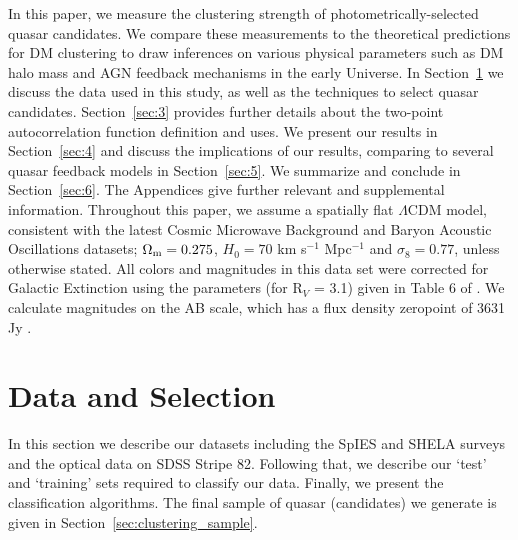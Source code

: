 \documentclass[apj, numberedappendix]{emulateapj}
\begin{document}
In this paper, we measure the clustering strength of photometrically-selected quasar candidates. We compare these measurements to the theoretical predictions for DM clustering to draw inferences on various physical parameters such as DM halo mass and AGN feedback mechanisms in the early Universe. In Section~\ref{sec:2} we discuss the data used in this study, as well as the techniques to select quasar candidates. Section~\ref{sec:3} provides further details about the two-point autocorrelation function definition and uses. We present our results in Section~\ref{sec:4} and discuss the implications of our results, comparing to several quasar feedback models in Section~\ref{sec:5}. We summarize and conclude in Section~\ref{sec:6}. The Appendices give further relevant and supplemental information. Throughout this paper, we assume a spatially flat $\Lambda$CDM model, consistent with the latest Cosmic Microwave Background \citep[CMB;][]{Planck2016} and Baryon Acoustic Oscillations \citep[BOSS;][]{Alam2016} datasets;  $\Omega_{\rm m} = 0.275$, $H_{0} = 70$ km s$^{-1}$ Mpc$^{-1}$ and $\sigma_{8}=0.77$, unless otherwise stated. All colors and magnitudes in this data set were corrected for Galactic Extinction using the parameters (for R$_V$ = 3.1) given in Table 6 of \citet{Schlafly2011}. We calculate magnitudes on the AB scale, which has a flux density zeropoint of 3631 Jy \citep{OkeGunn1983}.


\section{Data and Selection} \label{sec:2}

In this section we describe our datasets including the SpIES and SHELA surveys and the optical data on SDSS Stripe 82. Following that, we describe our `test' and `training' sets required to classify our data. Finally, we present the classification algorithms. The final sample of quasar (candidates) we generate is given in Section~\ref{sec:clustering_sample}.
\end{document}
